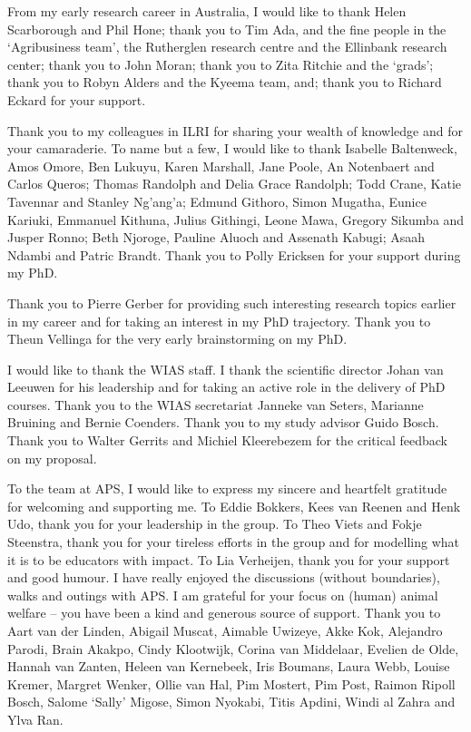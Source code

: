From my early research career in Australia, I would like to thank Helen Scarborough and Phil Hone; thank you to Tim Ada, and the fine people in the `Agribusiness team', the Rutherglen research centre and the Ellinbank research center; thank you to John Moran; thank you to Zita Ritchie and the `grads'; thank you to Robyn Alders and the Kyeema team, and; thank you to Richard Eckard for your support.  

Thank you to my colleagues in ILRI for sharing your wealth of knowledge and for your camaraderie. To name but a few, I would like to thank Isabelle Baltenweck, Amos Omore, Ben Lukuyu, Karen Marshall, Jane Poole, An Notenbaert and Carlos Queros; Thomas Randolph and Delia Grace Randolph; Todd Crane, Katie Tavennar and Stanley Ng'ang'a; Edmund Githoro, Simon Mugatha, Eunice Kariuki, Emmanuel Kithuna, Julius Githingi, Leone Mawa, Gregory Sikumba and Jusper Ronno; Beth Njoroge, Pauline Aluoch and Assenath Kabugi; Asaah Ndambi and Patric Brandt. Thank you to Polly Ericksen for your support during my PhD.

Thank you to Pierre Gerber for providing such interesting research topics earlier in my career and for taking an interest in my PhD trajectory. Thank you to Theun Vellinga for the very early brainstorming on my PhD.

I would like to thank the WIAS staff. I thank the scientific director Johan van Leeuwen for his leadership and for taking an active role in the delivery of PhD courses. Thank you to the WIAS secretariat Janneke van Seters, Marianne Bruining and Bernie Coenders. Thank you to my study advisor Guido Bosch. Thank you to Walter Gerrits and Michiel Kleerebezem for the critical feedback on my proposal.

To the team at APS, I would like to express my sincere and heartfelt gratitude for welcoming and supporting me. To Eddie Bokkers, Kees van Reenen and Henk Udo, thank you for your leadership in the group. To Theo Viets and Fokje Steenstra, thank you for your tireless efforts in the group and for modelling what it is to be educators with impact. To Lia Verheijen, thank you for your support and good humour. I have really enjoyed the discussions (without boundaries), walks and outings with APS. I am grateful for your focus on (human) animal welfare -- you have been a kind and generous source of support. Thank you to Aart van der Linden, Abigail Muscat, Aimable Uwizeye, Akke Kok, Alejandro Parodi, Brain Akakpo, Cindy Klootwijk, Corina van Middelaar, Evelien de Olde, Hannah van Zanten, Heleen van Kernebeek, Iris Boumans, Laura Webb, Louise Kremer, Margret Wenker, Ollie van Hal, Pim Mostert, Pim Post, Raimon Ripoll Bosch, Salome `Sally' Migose, Simon Nyokabi, Titis Apdini, Windi al Zahra and Ylva Ran.

